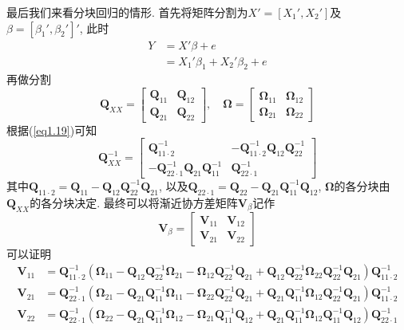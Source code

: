\documentclass[cn, 12pt, math=mtpro2, bibstyle=apa, blue, twocol]{elegantbook}
\newcommand{\Q}{\mathbold{Q}}
\newcommand{\V}{\mathbold{V}}
\newcommand{\BO}{\mathbold{\Omega}}
\begin{document}
最后我们来看分块回归的情形. 首先将矩阵分割为$X'=[X_1',X_2']$及$\beta=[\beta_1',\beta_2']'$, 此时
\begin{align*}
Y&=X'\beta+e \\
&=X_1'\beta_1+X_2'\beta_2+e
\end{align*}
再做分割
$$\Q_{XX}=\begin{bmatrix}
            \Q_{11} & \Q_{12} \\
            \Q_{21} & \Q_{22}
          \end{bmatrix},\quad \BO=\begin{bmatrix}
                                    \BO_{11} & \BO_{12} \\
                                    \BO_{21} & \BO_{22}
                                  \end{bmatrix}$$
根据(\ref{eq1.19})可知
$$\Q_{XX}^{-1}=\begin{bmatrix}
                 \Q_{11\cdot2}^{-1} & -\Q_{11\cdot2}^{-1}\Q_{12}\Q_{22}^{-1} \\
                 -\Q_{22\cdot1}^{-1}\Q_{21}\Q_{11}^{-1} & \Q_{22\cdot1}^{-1}
               \end{bmatrix}$$
其中$\Q_{11\cdot2}=\Q_{11}-\Q_{12}\Q_{22}^{-1}\Q_{21}$, 以及$\Q_{22\cdot1}=\Q_{22}-\Q_{21}\Q_{11}^{-1}\Q_{12}$, $\BO$的各分块由$\Q_{XX}$的各分块决定. 最终可以将渐近协方差矩阵$\V_\beta$记作
$$\V_\beta=\begin{bmatrix}
             \V_{11} & \V_{12} \\
             \V_{21} & \V_{22}
           \end{bmatrix}$$
可以证明
\begin{align*}
\V_{11}&=\Q_{11\cdot2}^{-1}(\BO_{11}-\Q_{12}\Q_{22}^{-1}\BO_{21}-\BO_{12}\Q_{22}^{-1}\Q_{21}+\Q_{12}\Q_{22}^{-1}\BO_{22}\Q_{22}^{-1}\Q_{21})\Q_{11\cdot2}^{-1} \\
\V_{21}&=\Q_{22\cdot1}^{-1}(\BO_{21}-\Q_{21}\Q_{11}^{-1}\BO_{11}-\BO_{22}\Q_{22}^{-1}\Q_{21}+\Q_{21}\Q_{11}^{-1}\BO_{12}\Q_{22}^{-1}\Q_{21})\Q_{11\cdot2}^{-1} \\
\V_{22}&=\Q_{22\cdot1}^{-1}(\BO_{22}-\Q_{21}\Q_{11}^{-1}\BO_{12}-\BO_{21}\Q_{11}^{-1}\Q_{12}+\Q_{21}\Q_{11}^{-1}\BO_{12}\Q_{11}^{-1}\Q_{12})\Q_{22\cdot1}^{-1}
\end{align*}
\end{document}
